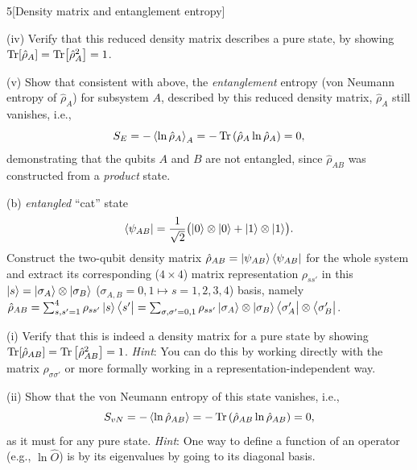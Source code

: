 \documentclass[12pt]{article}
\begin{document}
\begin{problem}{5}[Density matrix and entanglement entropy]
\begin{solution}
\end{solution}

\qquad(iv) Verify that this reduced density matrix describes a pure state, by
showing $\Tr[\hat\rho_A]=\Tr[\hat\rho_A^2]=1$.
\begin{solution}
    
\end{solution}

\qquad(v) Show that consistent with above, the \textit{entanglement} entropy
(von Neumann entropy of $\hat\rho_A$) for subsystem $A$, described by this
reduced density matrix, $\hat\rho_A$ still vanishes, i.e.,
\begin{equation}
    S_E=-\expval{\ln\hat\rho_A}_A=-\Tr\qty(\hat\rho_A\ln\hat\rho_A)=0, 
\end{equation}
demonstrating that the qubits $A$ and $B$ are not entangled, since
$\hat\rho_{AB}$ was constructed from a \textit{product} state.
\begin{solution}
    
\end{solution}

(b) \textit{entangled} ``cat'' state
\begin{equation}
    \bra{\psi_{AB}}=\frac1{\sqrt2}\qty(\ket0\otimes\ket0+\ket1\otimes\ket1).
\end{equation}
Construct the two-qubit density matrix
$\hat\rho_{AB}=\ket{\psi_{AB}}\bra{\psi_{AB}}$ for the whole system and extract
its corresponding ($4\times4$) matrix representation $\rho_{ss'}$ in this
$\ket{s}=\ket{\sigma_A}\otimes\ket{\sigma_B}$ ($\sigma_{A,B}=0,1\mapsto
s=1,2,3,4$) basis, namely
$\hat\rho_{AB}=\sum_{s,s'=1}^4\rho_{ss'}\ket{s}\bra{s'}=\sum_{\sigma,\sigma'=0,1}\rho_{ss'}\ket{\sigma_A}\otimes\ket{\sigma_B}\bra{\sigma_A'}\otimes\bra{\sigma_B'}$.

\qquad(i) Verify that this is indeed a density matrix for a pure state by
showing $\Tr[\hat\rho_{AB}]=\Tr\qty[\hat\rho_{AB}^2]=1$. \textit{Hint}: You can
do this by working directly with the matrix $\rho_{\sigma\sigma'}$ or more
formally working in a representation-independent way.
\begin{solution}
    
\end{solution}

\qquad(ii) Show that the von Neumann entropy of this state vanishes, i.e.,
\begin{equation}
    S_{vN}=-\expval{\ln\hat\rho_{AB}}=-\Tr\qty(\hat\rho_{AB}\ln\hat\rho_{AB})=0, 
\end{equation}
as it must for any pure state. \textit{Hint}: One way to define a function of an
operator (e.g., $\ln\hat{O}$) is by its eigenvalues by going to its diagonal
basis.
\begin{solution}
    

\end{solution}
\end{problem}
\end{document}
